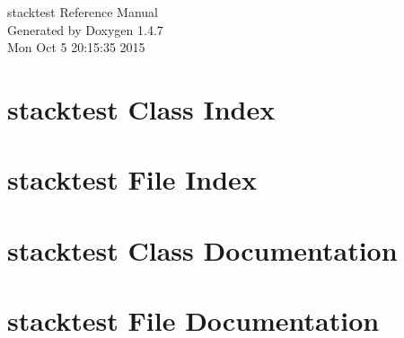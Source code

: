 \documentclass[a4paper]{book}
\begin{document}
\begin{titlepage}
\vspace*{7cm}
\begin{center}
{\Large stacktest Reference Manual}\\
\vspace*{1cm}
{\large Generated by Doxygen 1.4.7}\\
\vspace*{0.5cm}
{\small Mon Oct 5 20:15:35 2015}\\
\end{center}
\end{titlepage}
\clearemptydoublepage
{}
\tableofcontents
\clearemptydoublepage
{}
\chapter{stacktest Class Index}

\chapter{stacktest File Index}

\chapter{stacktest Class Documentation}




\chapter{stacktest File Documentation}










\printindex
\end{document}
